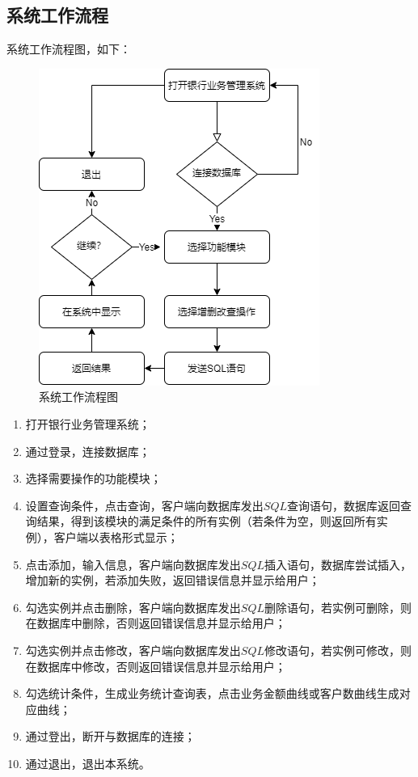 \documentclass{ctexart}
\begin{document}
\subsection{\hei 系统工作流程}
系统工作流程图，如下：
\begin{figure}[H]
    \centering
    \includegraphics[scale=0.7]{Untitled Diagram (1).png}
    \caption{系统工作流程图}
\end{figure}
\begin{enumerate}
    \item 打开银行业务管理系统；
    \item 通过登录，连接数据库；
    \item 选择需要操作的功能模块；
    \item 设置查询条件，点击查询，客户端向数据库发出$SQL$查询语句，数据库返回查询结果，得到该模块的满足条件的所有实例（若条件为空，则返回所有实例），客户端以表格形式显示；
    \item 点击添加，输入信息，客户端向数据库发出$SQL$插入语句，数据库尝试插入，增加新的实例，若添加失败，返回错误信息并显示给用户；
    \item 勾选实例并点击删除，客户端向数据库发出$SQL$删除语句，若实例可删除，则在数据库中删除，否则返回错误信息并显示给用户；
    \item 勾选实例并点击修改，客户端向数据库发出$SQL$修改语句，若实例可修改，则在数据库中修改，否则返回错误信息并显示给用户；
    \item 勾选统计条件，生成业务统计查询表，点击业务金额曲线或客户数曲线生成对应曲线；
    \item 通过登出，断开与数据库的连接；
    \item 通过退出，退出本系统。
\end{enumerate}
\end{document}
